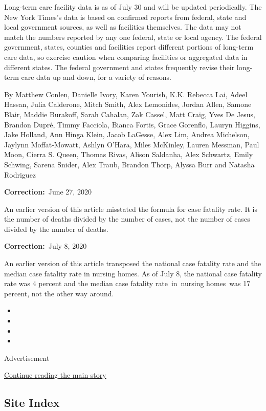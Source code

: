 Long-term care facility data is as of July 30 and will be updated
periodically. The New York Times's data is based on confirmed reports
from federal, state and local government sources, as well as facilities
themselves. The data may not match the numbers reported by any one
federal, state or local agency. The federal government, states, counties
and facilities report different portions of long-term care data, so
exercise caution when comparing facilities or aggregated data in
different states. The federal government and states frequently revise
their long-term care data up and down, for a variety of reasons.

By Matthew Conlen, Danielle Ivory, Karen Yourish, K.K. Rebecca Lai,
Adeel Hassan, Julia Calderone, Mitch Smith, Alex Lemonides, Jordan
Allen, Samone Blair, Maddie Burakoff, Sarah Cahalan, Zak Cassel, Matt
Craig, Yves De Jesus, Brandon Dupré, Timmy Facciola, Bianca Fortis,
Grace Gorenflo, Lauryn Higgins, Jake Holland, Ann Hinga Klein, Jacob
LaGesse, Alex Lim, Andrea Michelson, Jaylynn Moffat-Mowatt, Ashlyn
O'Hara, Miles McKinley, Lauren Messman, Paul Moon, Cierra S. Queen,
Thomas Rivas, Alison Saldanha, Alex Schwartz, Emily Schwing, Sarena
Snider, Alex Traub, Brandon Thorp, Alyssa Burr and Natasha Rodriguez

\textbf{Correction:}~June 27, 2020

An earlier version of this article misstated the formula for case
fatality rate. It is the number of deaths divided by the number of
cases, not the number of cases divided by the number of deaths.

\textbf{Correction:}~July 8, 2020

An earlier version of this article transposed the national case fatality
rate and the median case fatality rate in nursing homes. As of July 8,
the national case fatality rate was 4 percent and the median case
fatality rate~in~nursing homes~was 17 percent, not the other way around.

\begin{itemize}
\item
\item
\item
\item
\end{itemize}

Advertisement

\protect\hyperlink{after-bottom}{Continue reading the main story}

\hypertarget{site-index}{%
\subsection{Site Index}\label{site-index}}

